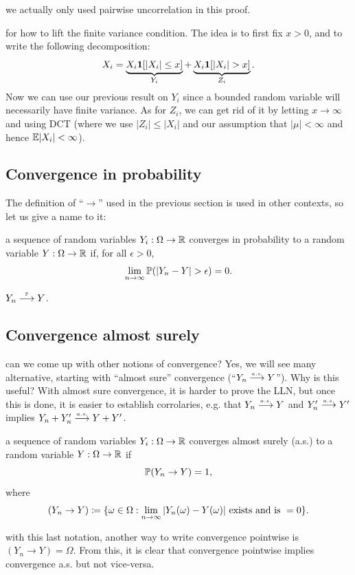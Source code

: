 \documentclass{article}
\begin{document}
 we actually only used pairwise uncorrelation in this proof.

 for how to lift the finite variance condition. The idea is to first fix $x > 0$, and to write the following decomposition:
\[ X_i = \underbrace{X_i \1[|X_i| \le x]}_{Y_i} + \underbrace{X_i \1[|X_i| > x]}_{Z_i}. \]
Now we can use our previous result on $Y_i$ since a bounded random variable will necessarily have finite variance. As for $Z_i$, we can get rid of it by letting $x \to \infty$ and using DCT (where we use $|Z_i| \le |X_i|$ and our assumption that $|\mu| < \infty$ and hence $\E|X_i| < \infty$).


\subsection{Convergence in probability}

The definition of ``$\to$'' used in the previous section is used in other contexts, so let us give a name to it:

 a sequence of random variables $Y_i : \Omega \to \R$ converges in probability to a random variable $Y: \Omega \to \R$ if, for all $\epsilon > 0$,
\[ \lim_{n\to\infty} \P(|Y_n - Y| > \epsilon) = 0. \]

 $Y_n \pcv Y$.


\subsection{Convergence almost surely}

 can we come up with other notions of convergence? Yes, we will see many alternative, starting with ``almost sure'' convergence (``$Y_n \ascv Y$''). Why is this useful? With almost sure convergence, it is harder to prove the LLN, but once this is done, it is easier to establish corrolaries, e.g. that $Y_n \ascv Y$ and $Y'_n \ascv Y'$ implies $Y_n + Y'_n \ascv Y + Y'$.

 a sequence of random variables $Y_i : \Omega \to \R$ converges almost surely (a.s.) to a random variable $Y: \Omega \to \R$ if \[ \P(Y_n \to Y) = 1,\] where \[ (Y_n \to Y) \defeq \{ \omega \in\Omega : \lim_{n\to\infty} |Y_n(\omega) - Y(\omega)|\text{ exists and is }=0\}. \]

 with this last notation, another way to write convergence pointwise is $(Y_n \to Y) = \Omega$. From this, it is clear that convergence pointwise implies convergence a.s. but not vice-versa.
\end{document}
